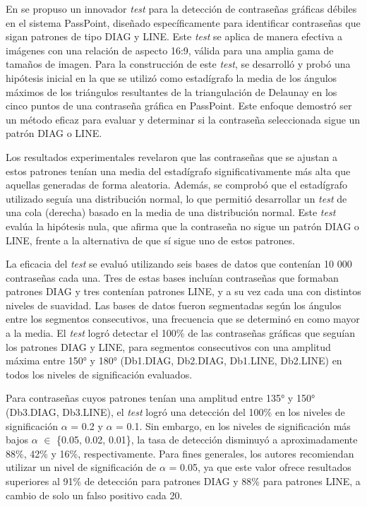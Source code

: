 \documentclass[12pt]{report}
\begin{document}

En \cite{13} se propuso un innovador \textit{test} para la detección de contraseñas gráficas débiles en el sistema PassPoint, diseñado específicamente para identificar contraseñas que sigan patrones de tipo DIAG y LINE. Este \textit{test} se aplica de manera efectiva a imágenes con una relación de aspecto 16:9, válida para una amplia gama de tamaños de imagen. Para la construcción de este \textit{test}, se desarrolló y probó una hipótesis inicial en la que se utilizó como estadígrafo la media de los ángulos máximos de los triángulos resultantes de la triangulación de Delaunay en los cinco puntos de una contraseña gráfica en PassPoint. Este enfoque demostró ser un método eficaz para evaluar y determinar si la contraseña seleccionada sigue un patrón DIAG o LINE.

Los resultados experimentales revelaron que las contraseñas que se ajustan a estos patrones tenían una media del estadígrafo significativamente más alta que aquellas generadas de forma aleatoria. Además, se comprobó que el estadígrafo utilizado seguía una distribución normal, lo que permitió desarrollar un \textit{test} de una cola (derecha) basado en la media de una distribución normal. Este \textit{test} evalúa la hipótesis nula, que afirma que la contraseña no sigue un patrón DIAG o LINE, frente a la alternativa de que sí sigue uno de estos patrones.

La eficacia del \textit{test} se evaluó utilizando seis bases de datos que contenían 10 000 contraseñas cada una. Tres de estas bases incluían contraseñas que formaban patrones DIAG y tres contenían patrones LINE, y a su vez cada una con distintos niveles de suavidad. Las bases de datos fueron segmentadas según los ángulos entre los segmentos consecutivos, una frecuencia que se determinó en \cite{5} como mayor a la media. El \textit{test} logró detectar el 100\% de las contraseñas gráficas que seguían los patrones DIAG y LINE, para segmentos consecutivos con una amplitud máxima entre 150° y 180° (Db1.DIAG, Db2.DIAG, Db1.LINE, Db2.LINE) en todos los niveles de significación evaluados.

Para contraseñas cuyos patrones tenían una amplitud entre 135° y 150° (Db3.DIAG, Db3.LINE), el \textit{test} logró una detección del 100\% en los niveles de significación $\alpha$ = 0.2 y $\alpha$ = 0.1. Sin embargo, en los niveles de significación más bajos  $\alpha$ $\in$ \{0.05, 0.02, 0.01\}, la tasa de detección disminuyó a aproximadamente 88\%, 42\% y 16\%, respectivamente. Para fines generales, los autores recomiendan utilizar un nivel de significación de $\alpha$ = 0.05, ya que este valor ofrece resultados superiores al 91\% de detección para patrones DIAG y 88\% para patrones LINE, a cambio de solo un falso positivo cada 20.
\end{document}

